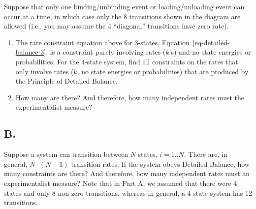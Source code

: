 \documentclass[
  letterpaper,
  DIV=11,
  numbers=noendperiod]{scrartcl}
\providecommand{\tightlist}{%
  \setlength{\itemsep}{0pt}\setlength{\parskip}{0pt}}
\begin{document}
Suppose that only one binding/unbinding event or loading/unloading event can occur at a time, in which case only the 8 transitions shown in the diagram are allowed (i.e., you may assume the 4 ``diagonal'' transitions have zero rate).

\begin{enumerate}
\def\labelenumi{\roman{enumi}.}
\tightlist
\item
  The rate constraint equation above for 3-states, Equation~\ref{eq-detailed-balance-3}, is a constraint purely involving rates (\(k\)'s) and no state energies or probabilities.
  For the 4-state system, find all constraints on the rates that only involve rates (\(k\), no state energies or probabilities) that are produced by the Principle of Detailed Balance.
\item
  How many are there? And therefore, how many independent rates must the experimentalist measure?
\end{enumerate}

\subsection{B.}\label{b.}

Suppose a system can transition between \(N\) states, \(i=1..N\).
There are, in general, \(N\cdot(N-1)\) transition rates.
If the system obeys Detailed Balance, how many constraints are there?
And therefore, how many independent rates must an experimentalist measure?
Note that in Part A, we assumed that there were 4 states and only 8 non-zero transitions, whereas in general, a 4-state system has 12 transitions.
\end{document}
